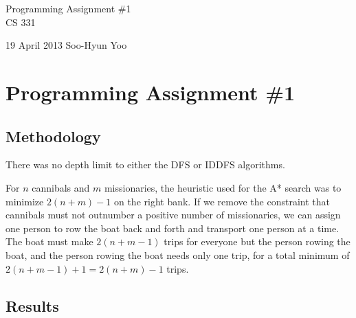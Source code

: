 \documentclass[12pt,letterpaper]{article}
\begin{document}
\begin{titlepage}
	\vspace*{4cm}
	\begin{flushright}
	{\huge
		Programming Assignment \#1 \\ [3cm]
	}
	{\large
		CS 331
	}
	\end{flushright}

	\begin{flushright}
		19 April 2013
		Soo-Hyun Yoo
	\end{flushright}
\end{titlepage}

\section*{Programming Assignment \#1}

\subsection*{Methodology}


There was no depth limit to either the DFS or IDDFS algorithms.

For $n$ cannibals and $m$ missionaries, the heuristic used for the A* search
was to minimize $2(n+m)-1$ on the right bank. If we remove the constraint that
cannibals must not outnumber a positive number of missionaries, we can assign
one person to row the boat back and forth and transport one person at a time.
The boat must make $2(n+m-1)$ trips for everyone but the person rowing the
boat, and the person rowing the boat needs only one trip, for a total minimum
of $2(n+m-1)+1 = 2(n+m)-1$ trips.


\subsection*{Results}
\end{document}
